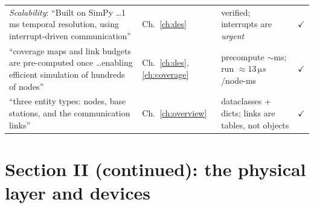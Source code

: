 \begin{center}
\begin{tabularx}{\linewidth}{@{}>{\raggedright}p{4.9cm}>{\raggedright}p{2.3cm}>{\raggedright}X>{\centering\arraybackslash}p{0.8cm}@{}}
\emph{Scalability}: ``Built on SimPy \ldots 1\,ms temporal resolution, using interrupt-driven communication'' & Ch.~\ref{ch:des} & verified; interrupts are \emph{urgent} & $\checkmark$\\
``coverage maps and link budgets are pre-computed once \ldots enabling efficient simulation of hundreds of nodes'' & Ch.~\ref{ch:des}, \ref{ch:coverage} & precompute $\sim$ms; run $\approx13\,\si{\micro s}$/node-ms & $\checkmark$\\
``three entity types: nodes, base stations, and the communication links'' & Ch.~\ref{ch:overview} & dataclasses + dicts; links are tables, not objects & $\checkmark$\\
\bottomrule
\end{tabularx}
\end{center}

\section{Section II (continued): the physical layer and devices}

